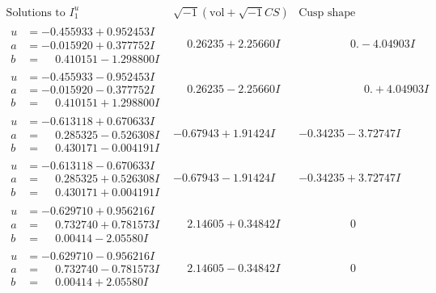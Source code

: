 \documentclass[1p]{elsarticle_modified}
\theoremstyle{definition}
\newcommand{\I}{\sqrt{-1}}
\begin{document}
$$\begin{array}{c|c|c}
 \end{array}$$\newpage$$\begin{array}{c|c|c}  
\text{Solutions to }I^u_{1}& \I (\text{vol} + \sqrt{-1}CS) & \text{Cusp shape}\\
 \hline 
\begin{aligned}
u &= -0.455933 + 0.952453 I \\
a &= -0.015920 + 0.377752 I \\
b &= \phantom{-}0.410151 - 1.298800 I\end{aligned}
 & \phantom{-}0.26235 + 2.25660 I & \phantom{-0.000000 } 0. - 4.04903 I \\ \hline\begin{aligned}
u &= -0.455933 - 0.952453 I \\
a &= -0.015920 - 0.377752 I \\
b &= \phantom{-}0.410151 + 1.298800 I\end{aligned}
 & \phantom{-}0.26235 - 2.25660 I & \phantom{-0.000000 -}0. + 4.04903 I \\ \hline\begin{aligned}
u &= -0.613118 + 0.670633 I \\
a &= \phantom{-}0.285325 - 0.526308 I \\
b &= \phantom{-}0.430171 - 0.004191 I\end{aligned}
 & -0.67943 + 1.91424 I & -0.34235 - 3.72747 I \\ \hline\begin{aligned}
u &= -0.613118 - 0.670633 I \\
a &= \phantom{-}0.285325 + 0.526308 I \\
b &= \phantom{-}0.430171 + 0.004191 I\end{aligned}
 & -0.67943 - 1.91424 I & -0.34235 + 3.72747 I \\ \hline\begin{aligned}
u &= -0.629710 + 0.956216 I \\
a &= \phantom{-}0.732740 + 0.781573 I \\
b &= \phantom{-}0.00414 - 2.05580 I\end{aligned}
 & \phantom{-}2.14605 + 0.34842 I & \phantom{-0.000000 } 0 \\ \hline\begin{aligned}
u &= -0.629710 - 0.956216 I \\
a &= \phantom{-}0.732740 - 0.781573 I \\
b &= \phantom{-}0.00414 + 2.05580 I\end{aligned}
 & \phantom{-}2.14605 - 0.34842 I & \phantom{-0.000000 } 0 \\ \hline\begin{aligned}

\end{aligned}
\end{array}$$
\end{document}
